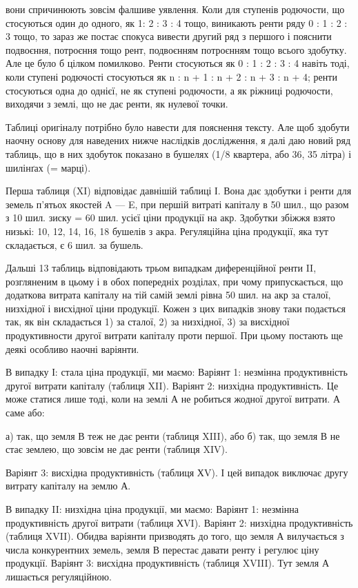 \parcont{}  %
вони спричинюють зовсім фалшиве уявлення. Коли для ступенів родючости, що
стосуються один до одного, як 1: 2 : 3 : 4 тощо, виникають ренти ряду 0 : 1 : 2 : 3
тощо, то зараз же постає спокуса вивести другий ряд з першого і пояснити
подвоєння, потроєння тощо рент, подвоєнням потроєнням тощо всього здобутку.
Але це було б цілком помилково. Ренти стосуються як 0 : 1 : 2 : 3 : 4 навіть
тоді, коли ступені родючості стосуються як n : n + 1 : n + 2 : n + 3 : n + 4;
ренти стосуються одна до однієї, не як ступені родючости, а як ріжниці родючости,
виходячи з землі, що не дає ренти, як нулевої точки.

Таблиці оригіналу потрібно було навести для пояснення тексту. Але щоб
здобути наочну основу для наведених нижче наслідків дослідження, я далі
даю новий ряд таблиць, що в них здобуток показано в бушелях (1/8 квартера,
або 36, 35 літра) і шилінґах (= марці).

Перша таблиця (XI) відповідає давнішій таблиці І. Вона дає здобутки
і ренти для земель п’ятьох якостей A — E, при першій витраті капіталу в 50
шил., що разом з 10 шил. зиску = 60 шил. усієї ціни продукції на акр. Здобутки
збіжжя взято низькі: 10, 12, 14, 16, 18 бушелів з акра. Регуляційна
ціна продукції, яка тут складається, є 6 шил. за бушель.

Дальші 13 таблиць відповідають трьом випадкам диференційної ренти II,
розгляненим в цьому і в обох попередніх розділах, при чому припускається, що
додаткова витрата капіталу на тій самій землі рівна 50 шил. на акр за сталої,
низхідної і висхідної ціни продукції. Кожен з цих випадків знову таки
подається так, як він складається 1) за сталої, 2) за низхідної, 3) за висхідної
продуктивности другої витрати капіталу проти першої. При цьому постають ще
деякі особливо наочні варіянти.

В випадку І: стала ціна продукції, ми маємо:
Варіянт 1: незмінна продуктивність другої витрати капіталу (таблиця XII).
Варіянт 2: низхідна продуктивність. Це може статися лише тоді, коли на землі
А не робиться жодної другої витрати. А саме або:

а) так, що земля В теж не дає ренти (таблиця XIII), або
б) так, що земля В не стає землею, що зовсім не дає ренти (таблиця XIV).

Варіянт 3: висхідна продуктивність (таблиця ХV). І цей випадок виключає
другу витрату капіталу на землю А.

В випадку II: низхідна ціна продукції, ми маємо:
Варіянт 1: незмінна продуктивність другої витрати (таблиця ХVI).
Варіянт 2: низхідна продуктивність (таблиця XVII). Обидва варіянти призводять
до того, що земля А вилучається з числа конкурентних земель, земля
В перестає давати ренту і регулює ціну продукції.
Варіянт 3: висхідна продуктивність (таблиця XVIII). Тут земля А лишається
регуляційною.

